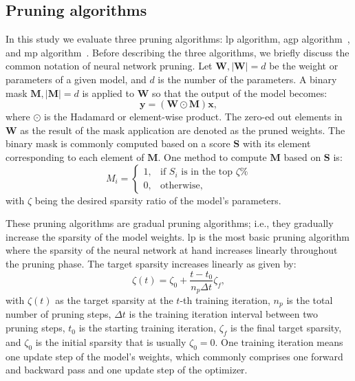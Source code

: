 \documentclass[mathematics,article,submit,pdftex,moreauthors]{Definitions/mdpi}
\renewcommand{\vec}[1]{\bm{#1}}
\begin{document}
\subsection{Pruning algorithms}
In this study we evaluate three pruning algorithms:
\ac{lp} algorithm, \ac{agp} algorithm~\cite{Han2017},
and \ac{mp} algorithm~\cite{Sanh2020}. Before
describing the three algorithms, we briefly discuss
the common notation of neural network pruning. 
Let $\vec{W}, |\vec{W}|=d$ be
the weight or parameters of a given model,
and $d$ is the number of the parameters. A
binary mask $\vec{M}, |\vec{M}|=d$
is applied to $\vec{W}$ so that the output of
the model becomes:
\begin{equation}
    \vec{y} = (\vec{W} \odot \vec{M})\vec{x}, 
\end{equation}
where $\odot$ is the Hadamard or element-wise product.
The zero-ed out elements in $\vec{W}$ as the result
of the mask application are denoted
as the pruned weights. The binary mask 
is commonly computed based on a score $\vec{S}$
with its element corresponding to each element of $\vec{M}$.
One method to compute $\vec{M}$ based on $\vec{S}$
is:
\begin{equation}
    M_i = \begin{cases}
        1, &\text{if } S_i \text{ is in the top } \zeta\% \\
        0, &\text{otherwise,}
    \end{cases}
\end{equation}
with  $\zeta$ being the desired sparsity ratio of the model's
parameters.

These pruning algorithms
are gradual pruning algorithms; i.e., 
they gradually increase the sparsity of the model weights.
\ac{lp} is the most basic pruning algorithm where the
sparsity of the neural network at hand increases
linearly throughout the pruning phase.
The target sparsity increases linearly as given by:
\begin{equation}
    \zeta(t) = \zeta_0 + \frac{t-t_0}{n_p \Delta t} \zeta_f,
\end{equation}
with $\zeta(t)$ as the target sparsity at the $t$-th 
training iteration, $n_p$ is the total number of pruning steps, 
$\Delta t$ is the training iteration interval between
two pruning steps, $t_0$ is the starting training iteration,
 $\zeta_f$ is the final target sparsity, and $\zeta_0$ is 
 the initial sparsity that is usually $\zeta_0=0$.
One training iteration means one update step of the model's weights,
which commonly comprises one forward and backward pass and 
one update step of the optimizer. 
\end{document}
